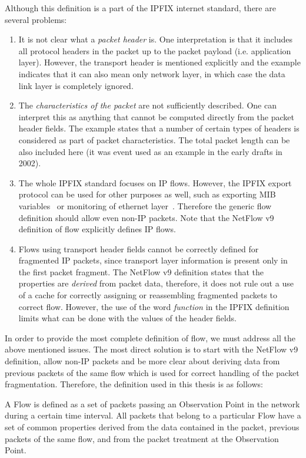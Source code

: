 Although this definition is a part of the IPFIX internet standard, there are several problems:
\begin{enumerate}
	\item It is not clear what a \emph{packet header} is. One interpretation is that it includes all protocol headers in the packet up to the packet payload (i.e. application layer). However, the transport header is mentioned explicitly and the example indicates that it can also mean only network layer, in which case the data link layer is completely ignored.
	\item The \emph{characteristics of the packet} are not sufficiently described. One can interpret this as anything that cannot be computed directly from the packet header fields. The example states that a number of certain types of headers is considered as part of packet characteristics. The total packet length can be also included here (it was event used as an example in the early drafts in 2002).
	\item The whole IPFIX standard focuses on IP flows. However, the IPFIX export protocol can be used for other purposes as well, such as exporting MIB variables~\cite{rfc6615} or monitoring of ethernet layer~\cite{Hofstede-2011-Flow}. Therefore the generic flow definition should allow even non-IP packets. Note that the NetFlow v9 definition of flow explicitly defines IP flows.
	\item Flows using transport header fields cannot be correctly defined for fragmented IP packets, since transport layer information is present only in the first packet fragment. The NetFlow v9 definition states that the properties are \emph{derived} from packet data, therefore, it does not rule out a use of a cache for correctly assigning or reassembling fragmented packets to correct flow. However, the use of the word \emph{function} in the IPFIX definition limits what can be done with the values of the header fields.
\end{enumerate}

In order to provide the most complete definition of flow, we must address all the above mentioned issues. The most direct solution is to start with the NetFlow v9 definition, allow non-IP packets and be more clear about deriving data from previous packets of the same flow which is used for correct handling of the packet fragmentation. Therefore, the definition used in this thesis is as follows:

\begin{displayquote}

    A Flow is defined as a set of packets passing an Observation Point
    in the network during a certain time interval. All packets that belong
    to a particular Flow have a set of common properties derived from
    the data contained in the packet, previous packets of the same flow,
    and from the packet treatment at the Observation Point.
   
\end{displayquote}

